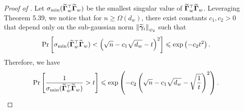 \begin{proof}[Proof of ]
    Let $\sigma_{\min}(\widetilde{\boldsymbol{\Gamma}}_w^\top \widetilde{\boldsymbol{\Gamma}}_w)$ be the smallest singular value of $\widetilde{\boldsymbol{\Gamma}}_w^\top \widetilde{\boldsymbol{\Gamma}}_w$.
    Leveraging \cite{vershynin2010introduction} Theorem 5.39, we notice that for $n \ge \Omega(d_w)$, there exist constants $c_1, c_2 > 0$ that depend only on the sub-gaussian norm $\left\|\widetilde{\boldsymbol{\gamma}}_i\right\|_{\psi_2}$ such that
    \begin{align*}
        \Pr\left[\sigma_{\min}(\widetilde{\boldsymbol{\Gamma}}_w^\top \widetilde{\boldsymbol{\Gamma}}_w) < \left(\sqrt{n} - c_1\sqrt{d_w} - t\right)^2\right] \leqslant \exp\left(-c_2 t^2\right).
    \end{align*}
    Therefore, we have 
    \begin{align*}
        \Pr\left[\frac{1}{\sigma_{\min}(\widetilde{\boldsymbol{\Gamma}}_w^\top \widetilde{\boldsymbol{\Gamma}}_w)} > t\right] \leqslant \exp\left(-c_2 \left(\sqrt{n} - c_1 \sqrt{d_w} - \sqrt{\frac{1}{t}}\right)^2\right).
    \end{align*}


\end{proof}
